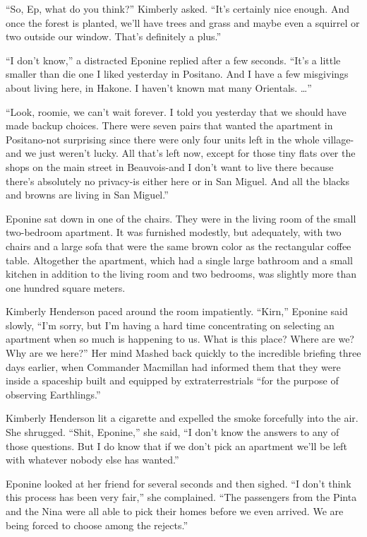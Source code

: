 \documentclass[]{article}
\begin{document}
{“So, Ep, what do you think?” Kimberly asked. “It’s certainly nice enough. And once the forest is planted, we’ll have trees and grass and maybe even a squirrel or two outside our window. That’s definitely a plus.”

“I don’t know,” a distracted Eponine replied after a few seconds. “It’s a little smaller than die one I liked yesterday in Positano. And I have a few misgivings about living here, in Hakone. I haven’t known mat many Orientals. …”

“Look, roomie, we can’t wait forever. I told you yesterday that we should have made backup choices. There were seven pairs that wanted the apartment in Positano-not surprising since there were only four units left in the whole village-and we just weren’t lucky. All that’s left now, except for those tiny flats over the shops on the main street in Beauvois-and I don’t want to live there because there’s absolutely no privacy-is either here or in San Miguel. And all the blacks and browns are living in San Miguel.”

Eponine sat down in one of the chairs. They were in the living room of the small two-bedroom apartment. It was furnished modestly, but adequately, with two chairs and a large sofa that were the same brown color as the rectangular coffee table. Altogether the apartment, which had a single large bathroom and a small kitchen in addition to the living room and two bedrooms, was slightly more than one hundred square meters.

Kimberly Henderson paced around the room impatiently. “Kirn,” Eponine said slowly, “I’m sorry, but I’m having a hard time concentrating on selecting an apartment when so much is happening to us. What is this place? Where are we? Why are we here?” Her mind Mashed back quickly to the incredible briefing three days earlier, when Commander Macmillan had informed them that they were inside a spaceship built and equipped by extraterrestrials “for the purpose of observing Earthlings.”

Kimberly Henderson lit a cigarette and expelled the smoke forcefully into the air. She shrugged. “Shit, Eponine,” she said, “I don’t know the answers to any of those questions. But I do know that if we don’t pick an apartment we’ll be left with whatever nobody else has wanted.”

Eponine looked at her friend for several seconds and then sighed. “I don’t think this process has been very fair,” she complained. “The passengers from the Pinta and the Nina were all able to pick their homes before we even arrived. We are being forced to choose among the rejects.”

}
\end{document}
